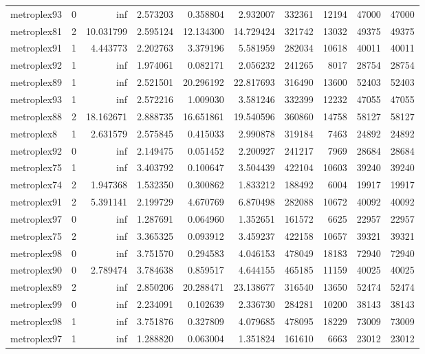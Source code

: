 \documentclass[../../../thesis.tex]{subfiles}
\begin{document}
\begin{longtable}{|l|r|r|r|r|r|r|r|r|r|}
metroplex93 & 0 & inf & 2.573203 & 0.358804 & 2.932007 & 332361 & 12194 & 47000 & 47000 \\
metroplex81 & 2 & 10.031799 & 2.595124 & 12.134300 & 14.729424 & 321742 & 13032 & 49375 & 49375 \\
metroplex91 & 1 & 4.443773 & 2.202763 & 3.379196 & 5.581959 & 282034 & 10618 & 40011 & 40011 \\
metroplex92 & 1 & inf & 1.974061 & 0.082171 & 2.056232 & 241265 & 8017 & 28754 & 28754 \\
metroplex89 & 1 & inf & 2.521501 & 20.296192 & 22.817693 & 316490 & 13600 & 52403 & 52403 \\
metroplex93 & 1 & inf & 2.572216 & 1.009030 & 3.581246 & 332399 & 12232 & 47055 & 47055 \\
metroplex88 & 2 & 18.162671 & 2.888735 & 16.651861 & 19.540596 & 360860 & 14758 & 58127 & 58127 \\
metroplex8 & 1 & 2.631579 & 2.575845 & 0.415033 & 2.990878 & 319184 & 7463 & 24892 & 24892 \\
metroplex92 & 0 & inf & 2.149475 & 0.051452 & 2.200927 & 241217 & 7969 & 28684 & 28684 \\
metroplex75 & 1 & inf & 3.403792 & 0.100647 & 3.504439 & 422104 & 10603 & 39240 & 39240 \\
metroplex74 & 2 & 1.947368 & 1.532350 & 0.300862 & 1.833212 & 188492 & 6004 & 19917 & 19917 \\
metroplex91 & 2 & 5.391141 & 2.199729 & 4.670769 & 6.870498 & 282088 & 10672 & 40092 & 40092 \\
metroplex97 & 0 & inf & 1.287691 & 0.064960 & 1.352651 & 161572 & 6625 & 22957 & 22957 \\
metroplex75 & 2 & inf & 3.365325 & 0.093912 & 3.459237 & 422158 & 10657 & 39321 & 39321 \\
metroplex98 & 0 & inf & 3.751570 & 0.294583 & 4.046153 & 478049 & 18183 & 72940 & 72940 \\
metroplex90 & 0 & 2.789474 & 3.784638 & 0.859517 & 4.644155 & 465185 & 11159 & 40025 & 40025 \\
metroplex89 & 2 & inf & 2.850206 & 20.288471 & 23.138677 & 316540 & 13650 & 52474 & 52474 \\
metroplex99 & 0 & inf & 2.234091 & 0.102639 & 2.336730 & 284281 & 10200 & 38143 & 38143 \\
metroplex98 & 1 & inf & 3.751876 & 0.327809 & 4.079685 & 478095 & 18229 & 73009 & 73009 \\
metroplex97 & 1 & inf & 1.288820 & 0.063004 & 1.351824 & 161610 & 6663 & 23012 & 23012 \\

\end{longtable}
\end{document}
